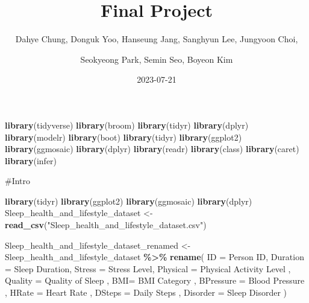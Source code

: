 \documentclass[
  11pt,
]{article}
\title{Final Project}
\author{Dahye Chung, Donguk Yoo, Hanseung Jang, Sanghyun Lee, Jungyoon
Choi, \and Seokyeong Park, Semin Seo, Boyeon Kim}
\date{2023-07-21}
\newenvironment{Shaded}{\begin{snugshade}}{\end{snugshade}}
\newcommand{\AttributeTok}[1]{\textcolor[rgb]{0.13,0.29,0.53}{#1}}
\newcommand{\FunctionTok}[1]{\textcolor[rgb]{0.13,0.29,0.53}{\textbf{#1}}}
\newcommand{\NormalTok}[1]{#1}
\newcommand{\OtherTok}[1]{\textcolor[rgb]{0.56,0.35,0.01}{#1}}
\newcommand{\SpecialCharTok}[1]{\textcolor[rgb]{0.81,0.36,0.00}{\textbf{#1}}}
\newcommand{\StringTok}[1]{\textcolor[rgb]{0.31,0.60,0.02}{#1}}
\begin{document}
\maketitle

\begin{Shaded}
\begin{Highlighting}[]
\FunctionTok{library}\NormalTok{(tidyverse)}
\FunctionTok{library}\NormalTok{(broom)}
\FunctionTok{library}\NormalTok{(tidyr)}
\FunctionTok{library}\NormalTok{(dplyr)}
\FunctionTok{library}\NormalTok{(modelr)}
\FunctionTok{library}\NormalTok{(boot)}
\FunctionTok{library}\NormalTok{(tidyr)}
\FunctionTok{library}\NormalTok{(ggplot2)}
\FunctionTok{library}\NormalTok{(ggmosaic)}
\FunctionTok{library}\NormalTok{(dplyr)}
\FunctionTok{library}\NormalTok{(readr)}
\FunctionTok{library}\NormalTok{(class)}
\FunctionTok{library}\NormalTok{(caret)}
\FunctionTok{library}\NormalTok{(infer)}
\end{Highlighting}
\end{Shaded}

\#Intro

\begin{Shaded}
\begin{Highlighting}[]
\FunctionTok{library}\NormalTok{(tidyr)}
\FunctionTok{library}\NormalTok{(ggplot2)}
\FunctionTok{library}\NormalTok{(ggmosaic)}
\FunctionTok{library}\NormalTok{(dplyr)}
\NormalTok{Sleep\_health\_and\_lifestyle\_dataset }\OtherTok{\textless{}{-}} \FunctionTok{read\_csv}\NormalTok{(}\StringTok{"Sleep\_health\_and\_lifestyle\_dataset.csv"}\NormalTok{)}
\end{Highlighting}
\end{Shaded}

\begin{Shaded}
\begin{Highlighting}[]
\NormalTok{Sleep\_health\_and\_lifestyle\_dataset\_renamed }\OtherTok{\textless{}{-}}\NormalTok{ Sleep\_health\_and\_lifestyle\_dataset }\SpecialCharTok{\%\textgreater{}\%}
  \FunctionTok{rename}\NormalTok{( }\AttributeTok{ID =} \StringTok{\textquotesingle{}Person ID\textquotesingle{}}\NormalTok{,}
          \AttributeTok{Duration =} \StringTok{\textquotesingle{}Sleep Duration\textquotesingle{}}\NormalTok{,}
          \AttributeTok{Stress =} \StringTok{\textquotesingle{}Stress Level\textquotesingle{}}\NormalTok{,}
          \AttributeTok{Physical =} \StringTok{\textquotesingle{}Physical Activity Level\textquotesingle{}}\NormalTok{ ,}
          \AttributeTok{Quality =} \StringTok{\textquotesingle{}Quality of Sleep\textquotesingle{}}\NormalTok{ ,}
          \AttributeTok{BMI=} \StringTok{\textquotesingle{}BMI Category\textquotesingle{}}\NormalTok{ ,}
          \AttributeTok{BPressure =} \StringTok{\textquotesingle{}Blood Pressure\textquotesingle{}}\NormalTok{ ,}
          \AttributeTok{HRate =} \StringTok{\textquotesingle{}Heart Rate\textquotesingle{}}\NormalTok{ ,}
          \AttributeTok{DSteps =} \StringTok{\textquotesingle{}Daily Steps\textquotesingle{}}\NormalTok{ ,}
          \AttributeTok{Disorder =} \StringTok{\textquotesingle{}Sleep Disorder\textquotesingle{}}\NormalTok{ )}
\end{Highlighting}
\end{Shaded}
\end{document}
